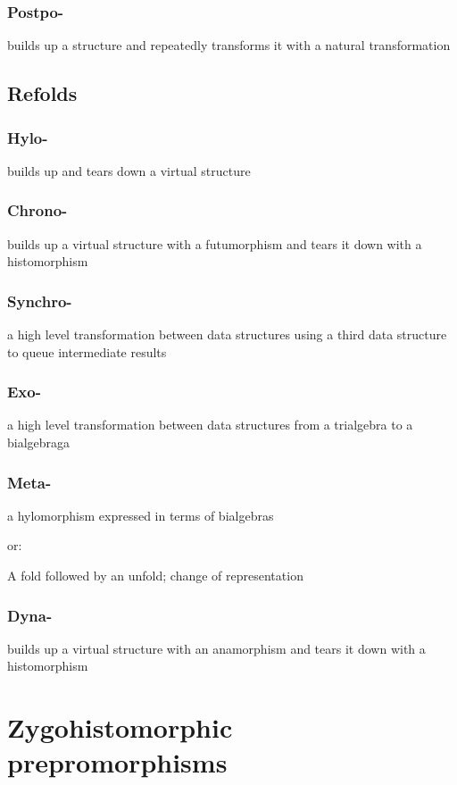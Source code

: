\documentclass{beamer}
\begin{document}
\begin{frame}
\frametitle{Postpo-}

builds up a structure and repeatedly transforms it with a natural transformation
\end{frame}

\subsection{Refolds}

\begin{frame}
\frametitle{Hylo-}

builds up and tears down a virtual structure
\end{frame}

\begin{frame}
\frametitle{Chrono-}

builds up a virtual structure with a futumorphism and tears it down
with a histomorphism
\end{frame}

\begin{frame}
\frametitle{Synchro-}

a high level transformation between data structures using a third data structure to queue intermediate results
\end{frame}

\begin{frame}
\frametitle{Exo-}

a high level transformation between data structures from a trialgebra to a bialgebraga
\end{frame}

\begin{frame}
\frametitle{Meta-}

a hylomorphism expressed in terms of bialgebras

or:

A fold followed by an unfold; change of representation
\end{frame}

\begin{frame}
\frametitle{Dyna-}

builds up a virtual structure with an anamorphism and tears it down with a histomorphism
\end{frame}

\section{Zygohistomorphic prepromorphisms}
\end{document}
